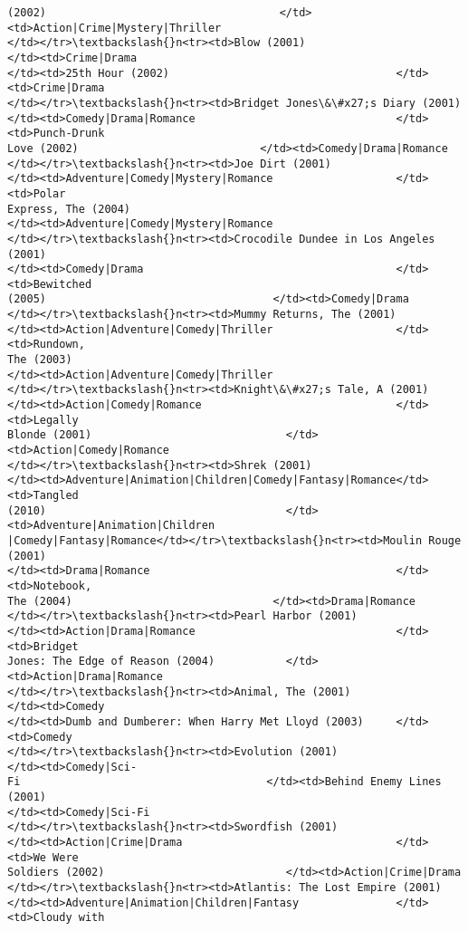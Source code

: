\documentclass[11pt]{article}
\begin{document}
\begin{tcolorbox}[breakable, size=fbox, boxrule=.5pt, pad at break*=1mm, opacityfill=0]
\begin{Verbatim}[commandchars=\\\{\}]
(2002)                                    </td><td>Action|Crime|Mystery|Thriller
</td></tr>\textbackslash{}n<tr><td>Blow (2001)                             </td><td>Crime|Drama
</td><td>25th Hour (2002)                                   </td><td>Crime|Drama
</td></tr>\textbackslash{}n<tr><td>Bridget Jones\&\#x27;s Diary (2001)
</td><td>Comedy|Drama|Romance                               </td><td>Punch-Drunk
Love (2002)                            </td><td>Comedy|Drama|Romance
</td></tr>\textbackslash{}n<tr><td>Joe Dirt (2001)
</td><td>Adventure|Comedy|Mystery|Romance                   </td><td>Polar
Express, The (2004)
</td><td>Adventure|Comedy|Mystery|Romance
</td></tr>\textbackslash{}n<tr><td>Crocodile Dundee in Los Angeles (2001)
</td><td>Comedy|Drama                                       </td><td>Bewitched
(2005)                                   </td><td>Comedy|Drama
</td></tr>\textbackslash{}n<tr><td>Mummy Returns, The (2001)
</td><td>Action|Adventure|Comedy|Thriller                   </td><td>Rundown,
The (2003)
</td><td>Action|Adventure|Comedy|Thriller
</td></tr>\textbackslash{}n<tr><td>Knight\&\#x27;s Tale, A (2001)
</td><td>Action|Comedy|Romance                              </td><td>Legally
Blonde (2001)                              </td><td>Action|Comedy|Romance
</td></tr>\textbackslash{}n<tr><td>Shrek (2001)
</td><td>Adventure|Animation|Children|Comedy|Fantasy|Romance</td><td>Tangled
(2010)                                     </td><td>Adventure|Animation|Children
|Comedy|Fantasy|Romance</td></tr>\textbackslash{}n<tr><td>Moulin Rouge (2001)
</td><td>Drama|Romance                                      </td><td>Notebook,
The (2004)                               </td><td>Drama|Romance
</td></tr>\textbackslash{}n<tr><td>Pearl Harbor (2001)
</td><td>Action|Drama|Romance                               </td><td>Bridget
Jones: The Edge of Reason (2004)           </td><td>Action|Drama|Romance
</td></tr>\textbackslash{}n<tr><td>Animal, The (2001)                      </td><td>Comedy
</td><td>Dumb and Dumberer: When Harry Met Lloyd (2003)     </td><td>Comedy
</td></tr>\textbackslash{}n<tr><td>Evolution (2001)                        </td><td>Comedy|Sci-
Fi                                      </td><td>Behind Enemy Lines (2001)
</td><td>Comedy|Sci-Fi
</td></tr>\textbackslash{}n<tr><td>Swordfish (2001)
</td><td>Action|Crime|Drama                                 </td><td>We Were
Soldiers (2002)                            </td><td>Action|Crime|Drama
</td></tr>\textbackslash{}n<tr><td>Atlantis: The Lost Empire (2001)
</td><td>Adventure|Animation|Children|Fantasy               </td><td>Cloudy with

\end{Verbatim}
\end{tcolorbox}
\end{document}
